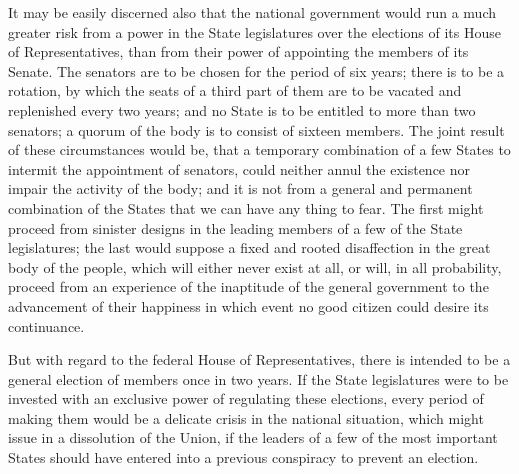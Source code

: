 It may be easily discerned also that the national government would run a much greater risk from a power in the State legislatures over the elections of its House of Representatives, than from their power of appointing the members of its Senate. 
The senators are to be chosen for the period of six years; there is to be a rotation, by which the seats of a third part of them are to be vacated and replenished every two years; and no State is to be entitled to more than two senators; a quorum of the body is to consist of sixteen members. 
The joint result of these circumstances would be, that a temporary combination of a few States to intermit the appointment of senators, could neither annul the existence nor impair the activity of the body; and it is not from a general and permanent combination of the States that we can have any thing to fear. 
The first might proceed from sinister designs in the leading members of a few of the State legislatures; the last would suppose a fixed and rooted disaffection in the great body of the people, which will either never exist at all, or will, in all probability, proceed from an experience of the inaptitude of the general government to the advancement of their happiness in which event no good citizen could desire its continuance.

But with regard to the federal House of Representatives, there is intended to be a general election of members once in two years. 
If the State legislatures were to be invested with an exclusive power of regulating these elections, every period of making them would be a delicate crisis in the national situation, which might issue in a dissolution of the Union, if the leaders of a few of the most important States should have entered into a previous conspiracy to prevent an election.

